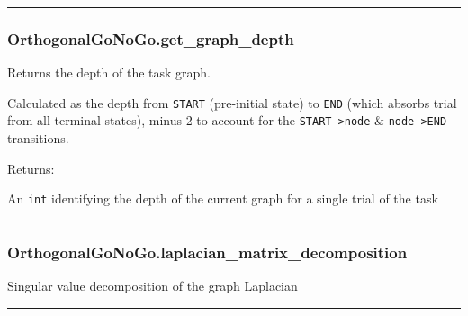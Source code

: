 \begin{center}\rule{0.5\linewidth}{\linethickness}\end{center}

\hypertarget{orthogonalgonogo.get_graph_depth}{%
\subsubsection{OrthogonalGoNoGo.get\_graph\_depth}\label{orthogonalgonogo.get_graph_depth}}

\begin{Shaded}
\begin{Highlighting}[]
\NormalTok{)}
\end{Highlighting}
\end{Shaded}

Returns the depth of the task graph.

Calculated as the depth from \texttt{START} (pre-initial state) to
\texttt{END} (which absorbs trial from all terminal states), minus 2 to
account for the \texttt{START-\textgreater{}node} \&
\texttt{node-\textgreater{}END} transitions.

Returns:

An \texttt{int} identifying the depth of the current graph for a single
trial of the task

\begin{center}\rule{0.5\linewidth}{\linethickness}\end{center}

\hypertarget{orthogonalgonogo.laplacian_matrix_decomposition}{%
\subsubsection{OrthogonalGoNoGo.laplacian\_matrix\_decomposition}\label{orthogonalgonogo.laplacian_matrix_decomposition}}

\begin{Shaded}
\begin{Highlighting}[]
\NormalTok{)}
\end{Highlighting}
\end{Shaded}

Singular value decomposition of the graph Laplacian

\begin{center}\rule{0.5\linewidth}{\linethickness}\end{center}

